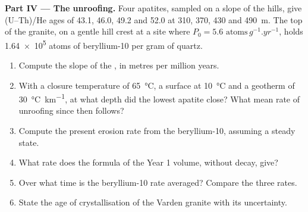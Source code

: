 \begin{problem}
\medskip\noindent\textbf{Part IV --- The unroofing.} Four apatites, sampled
on a slope of the hills, give (U--Th)/He ages of 43.1, 46.0, 49.2 and
\qty{52.0}{\Ma} at 310, 370, 430 and \qty{490}{m}. The top of the granite,
on a gentle hill crest at a site where $P_0 = \num{5.6}\text{ atoms}\,\unit{g^{-1}.yr^{-1}}$,
holds \num{1.64e5} atoms of beryllium-10 per gram of quartz.
\begin{enumerate}[resume]
\item Compute the slope of the , in metres per
million years.
\item With a closure temperature of \qty{65}{\celsius}, a surface at
\qty{10}{\celsius} and a geotherm of \qty{30}{\celsius.km^{-1}}, at what depth
did the lowest apatite close? What mean rate of unroofing since then follows?
\item Compute the present erosion rate from the beryllium-10, assuming a steady
state.
\item What rate does the formula of the Year 1 volume, without decay, give?
\item Over what time is the beryllium-10 rate averaged? Compare the three
rates.
\item State the age of crystallisation of the Varden granite with its
uncertainty.
\end{enumerate}
\end{problem}
